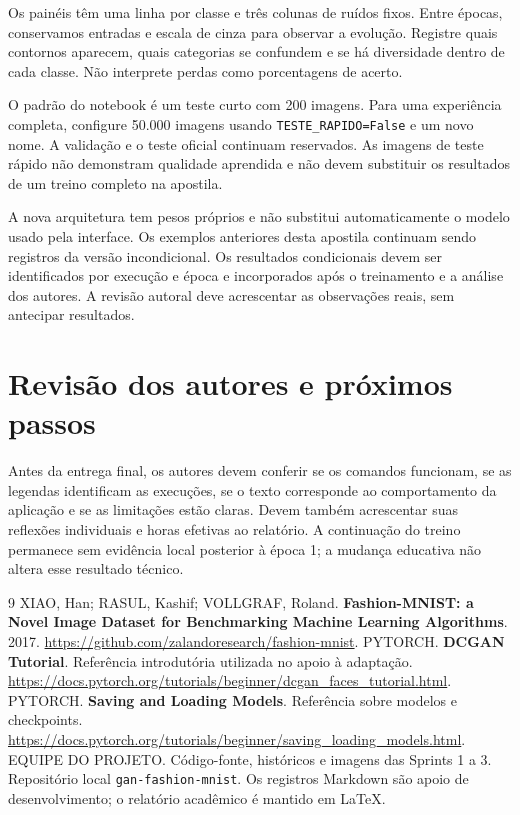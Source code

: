 \documentclass[12pt,a4paper]{article}
\begin{document}
Os painéis têm uma linha por classe e três colunas de ruídos fixos. Entre épocas, conservamos entradas e escala de cinza para observar a evolução. Registre quais contornos aparecem, quais categorias se confundem e se há diversidade dentro de cada classe. Não interprete perdas como porcentagens de acerto.

O padrão do notebook é um teste curto com 200 imagens. Para uma experiência completa, configure 50.000 imagens usando \verb|TESTE_RAPIDO=False| e um novo nome. A validação e o teste oficial continuam reservados. As imagens de teste rápido não demonstram qualidade aprendida e não devem substituir os resultados de um treino completo na apostila.

A nova arquitetura tem pesos próprios e não substitui automaticamente o modelo usado pela interface. Os exemplos anteriores desta apostila continuam sendo registros da versão incondicional. Os resultados condicionais devem ser identificados por execução e época e incorporados após o treinamento e a análise dos autores. A revisão autoral deve acrescentar as observações reais, sem antecipar resultados.

\section{Revisão dos autores e próximos passos}
Antes da entrega final, os autores devem conferir se os comandos funcionam, se as legendas identificam as execuções, se o texto corresponde ao comportamento da aplicação e se as limitações estão claras. Devem também acrescentar suas reflexões individuais e horas efetivas ao relatório. A continuação do treino permanece sem evidência local posterior à época 1; a mudança educativa não altera esse resultado técnico.

\begin{thebibliography}{9}
 XIAO, Han; RASUL, Kashif; VOLLGRAF, Roland. \textbf{Fashion-MNIST: a Novel Image Dataset for Benchmarking Machine Learning Algorithms}. 2017. \url{https://github.com/zalandoresearch/fashion-mnist}.
 PYTORCH. \textbf{DCGAN Tutorial}. Referência introdutória utilizada no apoio à adaptação. \url{https://docs.pytorch.org/tutorials/beginner/dcgan_faces_tutorial.html}.
 PYTORCH. \textbf{Saving and Loading Models}. Referência sobre modelos e checkpoints. \url{https://docs.pytorch.org/tutorials/beginner/saving_loading_models.html}.
 EQUIPE DO PROJETO. Código-fonte, históricos e imagens das Sprints 1 a 3. Repositório local \texttt{gan-fashion-mnist}. Os registros Markdown são apoio de desenvolvimento; o relatório acadêmico é mantido em LaTeX.
\end{thebibliography}
\end{document}
